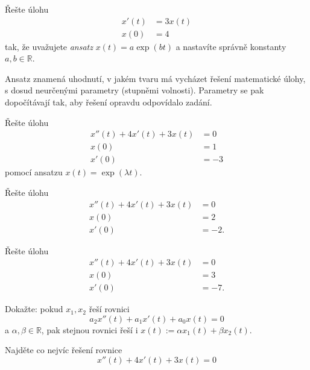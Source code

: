 \begin{úloha}
  Řešte úlohu 
  \begin{align*}
  	x'(t) &= 3x(t) \\
  	x(0) &= 4
  \end{align*}
  tak, že uvažujete \emph{ansatz} $x(t)=a\exp(bt)$ a nastavíte správně konstanty $a,b\in \mathbb{R}.$
\end{úloha}

\begin{poznámka}
  Ansatz znamená uhodnutí, v jakém tvaru má vycházet řešení matematické úlohy, s dosud neurčenými parametry (stupněmi volnosti). Parametry se pak dopočítávají tak, aby řešení opravdu odpovídalo zadání.
\end{poznámka}

\begin{úloha}
  Řešte úlohu
  \begin{align*}
	  x''(t)+4x'(t)+3x(t) &= 0 \\
  	x(0) &= 1 \\
	x'(0) &= -3
  \end{align*}
  pomocí ansatzu $x(t)=\exp(\lambda t).$
\end{úloha}

\begin{úloha}
  Řešte úlohu
  \begin{align*}
	  x''(t)+4x'(t)+3x(t) &= 0 \\
  	x(0) &= 2 \\
	x'(0) &= -2.
  \end{align*}
\end{úloha}

\begin{úloha}
  Řešte úlohu
  \begin{align*}
	  x''(t)+4x'(t)+3x(t) &= 0 \\
  	x(0) &= 3 \\
	x'(0) &= -7.
  \end{align*}
\end{úloha}

\begin{úloha}
  Dokažte: pokud $x_1, x_2$ řeší rovnici
  \begin{equation*}
    a_2x''(t)+a_1x'(t)+a_0x(t)=0
  \end{equation*}
  a $\alpha, \beta\in \mathbb{R}$, pak stejnou rovnici řeší i $x(t):=\alpha x_1(t)+\beta x_2(t).$
\end{úloha}

\begin{úloha}
  Najděte co nejvíc řešení rovnice
\begin{equation*}
  x''(t)+4x'(t)+3x(t)=0
\end{equation*}
\end{úloha}


